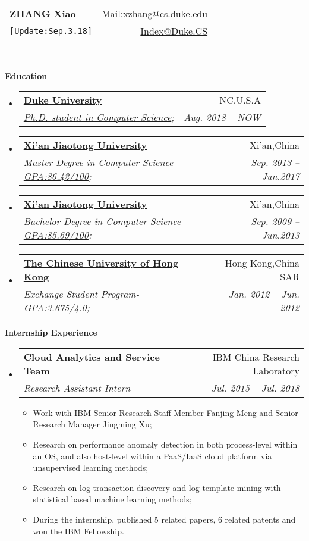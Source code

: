 \documentclass[letterpaper,11pt]{article}
\makeatletter
\newcommand{\resitem}[1]{\item #1 \vspace{-2pt}}
\newcommand{\resheading}[1]{{\large \colorbox{mygrey}{\begin{minipage}{\textwidth}{\textbf{#1 \vphantom{p\^{E}}}}\end{minipage}}}}
\newcommand{\ressubheading}[4]{
\begin{tabular*}{6.5in}{l@{\extracolsep{\fill}}r}
		\textbf{#1} & #2 \\
		\textit{#3} & \textit{#4} \\
\end{tabular*}\vspace{-6pt}}
\makeatother
\begin{document}
\newcommand{\mywebheader}{
\begin{tabular*}{7in}{l@{\extracolsep{\fill}}r}
	\textbf{\href{http://www.shane6.net/}{\LARGE ZHANG Xiao}} & \href{mailto:xzhang@cs.duke.edu}{Mail:xzhang@cs.duke.edu}\\
	{\footnotesize \texttt{{[Update:Sep.3.18]}}} & \href{https://users.cs.duke.edu/~xzhang/}{Index@Duke.CS} \\
	\end{tabular*}
\\
\vspace{0.1in}}

\mywebheader

\resheading{Education}
	\begin{itemize}
		\item
			\ressubheading{\href{http://www.duke.edu}{Duke University}}{NC,U.S.A}{\href{http://www.cs.duke.edu}{Ph.D. student in Computer Science};}{Aug. 2018 -- NOW }
		\item
			\ressubheading{\href{http://www.xjtu.edu.cn}{Xi'an Jiaotong University}}{Xi'an,China}{\href{http://www.cs.xjtu.edu.cn}{Master Degree in Computer Science-GPA:86.42/100};}{Sep. 2013 -- Jun.2017 }
		\item
			\ressubheading{\href{http://www.xjtu.edu.cn}{Xi'an Jiaotong University}}{Xi'an,China}{\href{http://www.cs.xjtu.edu.cn}{Bachelor Degree in Computer Science-GPA:85.69/100};}{Sep. 2009 --  Jun.2013}
		\item
			\ressubheading{\href{http://www.cuhk.edu.hk}{The Chinese University of Hong Kong}}{Hong Kong,China SAR}{{Exchange Student Program-GPA:3.675/4.0};}{Jan. 2012 -- Jun. 2012}
	\end{itemize} %

\resheading{Internship Experience}
	\begin{itemize}
		\item 
			\ressubheading{Cloud Analytics and Service Team}{IBM China Research Laboratory}{Research Assistant Intern}{Jul. 2015 -- Jul. 2018}
				{ \footnotesize
				\begin{itemize}
					\resitem{Work with IBM Senior Research Staff Member Fanjing Meng and Senior Research Manager Jingming Xu;}
					\resitem{Research on performance anomaly detection in both process-level within an OS, and also host-level within a PaaS/IaaS cloud platform via unsupervised learning methods;}
					\resitem{Research on log transaction discovery and log template mining with statistical based machine learning methods;}
					\resitem{During the internship, published 5 related papers, 6 related patents and won the IBM Fellowship.}
				\end{itemize}
				}

	\end{itemize}
	
\end{document}
